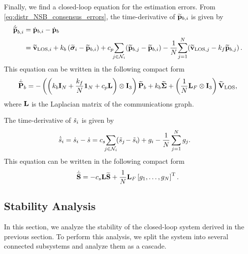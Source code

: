 Finally, we find a closed-loop equation for the estimation errors.
From \eqref{eq:distr_NSB_consensus_errors}, the time-derivative of $\widetilde{\mathbf{p}}_{b, i}$ is given by
    \begin{align}
        \dot{\widetilde{\mathbf{p}}}_{b, i} &= \dot{\mathbf{p}}_{b, i} - \dot{\mathbf{p}}_b \\
        &= \widetilde{\mathbf{v}}_{{\rm LOS}, i} + k_b\left(\widetilde{\bm{\sigma}}_i - \widetilde{\mathbf{p}}_{b, i}\right) +  c_p \!\! \sum_{j \in \mathcal{N}_i} \! \left(\widetilde{\mathbf{p}}_{b, j} - \widetilde{\mathbf{p}}_{b, i}\right) - \frac{1}{N}\!\sum_{j=1}^N\! \left(\widetilde{\mathbf{v}}_{{\rm LOS}, j} - k_f \widetilde{\mathbf{p}}_{b, j}\right). \nonumber
    \end{align}
This equation can be written in the following compact form
\begin{equation}
        \dot{\widetilde{\mathbf{P}}}_{b} = - \left(\left(k_b \mathbf{I}_N + \frac{k_f}{N}\mathbf{1}_N + c_p \mathbf{L}\right) \otimes \mathbf{I}_3\right) \widetilde{\mathbf{P}}_{b} + k_b \widetilde{\bm{\Sigma}} + \left(\frac{1}{N}\mathbf{L}_{F} \otimes \mathbf{I}_3\right) \widetilde{\mathbf{V}}_{\rm LOS},
    \label{eq:distr_NSB_P_tilde_CL}
\end{equation}
where $\mathbf{L}$ is the Laplacian matrix of the communications graph.

The time-derivative of $\Tilde{s}_{i}$ is given by
\begin{equation}
    \begin{split}
        \dot{\Tilde{s}}_{i} &= \dot{s}_i - \dot{s} = c_s \!\! \sum_{j \in \mathcal{N}_i}\!\! \left(\Tilde{s}_{j\!} - \Tilde{s}_{i\!}\right) + g_i - \frac{1}{N}\sum_{j=1}^N g_j.
    \end{split}
\end{equation}
This equation can be written in the following compact form
\begin{equation}
    \dot{\widetilde{\mathbf{S}}} = -c_s \mathbf{L} \widetilde{\mathbf{S}} + \frac{1}{N} \mathbf{L}_{F} \left[g_1, \ldots, g_N\right]^{\mathrm{T}}.
    \label{eq:distr_NSB_S_tilde_CL}
\end{equation}

\subsection{Stability Analysis}
In this section, we analyze the stability of the closed-loop system derived in the previous section.
To perform this analysis, we split the system into several connected subsystems and analyze them as a cascade.


